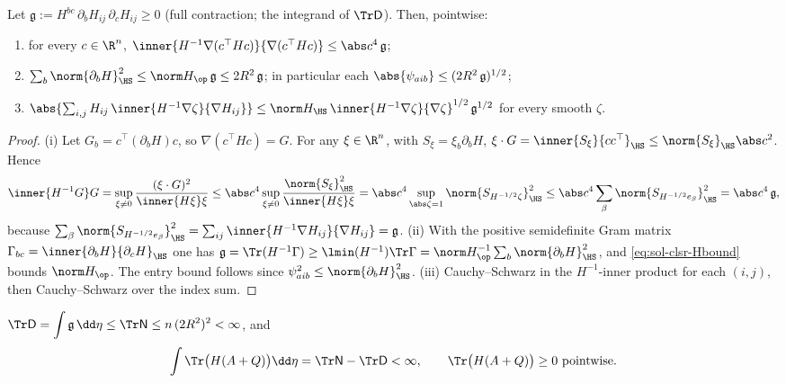 \documentclass[../main.tex]{subfiles}
\begin{document}
\begin{lemma}
\label{lem:sol-clsr-domination}
Let $\mathfrak g:=H^{bc}\,\partial_bH_{ij}\,\partial_cH_{ij}\ge0$ (full contraction; the
integrand of $\Tr\mathsf D$).  Then, pointwise:
\begin{enumerate}[label=(\roman*),leftmargin=2.2em]
\item for every $c\in\R^n$,
$\inner{H^{-1}\nabla(c^\top Hc)}{\nabla(c^\top Hc)}\le\abs c^4\,\mathfrak g$;
\item $\sum_b\norm{\partial_bH}_{\HS}^2\le\norm H_\op\,\mathfrak g\le 2R^2\,\mathfrak g$; in
particular each $\abs{\psi_{aib}}\le(2R^2\,\mathfrak g)^{1/2}$;
\item $\abs{\sum_{i,j}H_{ij}\,\inner{H^{-1}\nabla\zeta}{\nabla H_{ij}}}
\le\norm H_{\HS}\,\inner{H^{-1}\nabla\zeta}{\nabla\zeta}^{1/2}\,\mathfrak g^{1/2}$
for every smooth $\zeta$.
\end{enumerate}
\end{lemma}

\begin{proof}
(i) Let $G_b=c^\top(\partial_bH)c$, so $\nabla(c^\top Hc)=G$.  For any $\xi\in\R^n$, with
$S_\xi=\xi_b\partial_bH$,
$\xi\cdot G=\inner{S_\xi}{cc^\top}_{\HS}\le\norm{S_\xi}_{\HS}\abs c^2$.  Hence
\[
  \inner{H^{-1}G}G=\sup_{\xi\ne0}\frac{(\xi\cdot G)^2}{\inner{H\xi}\xi}
  \le\abs c^4\sup_{\xi\ne0}\frac{\norm{S_\xi}_{\HS}^2}{\inner{H\xi}\xi}
  =\abs c^4\sup_{\abs\zeta=1}\norm{S_{H^{-1/2}\zeta}}_{\HS}^2
  \le\abs c^4\sum_\beta\norm{S_{H^{-1/2}e_\beta}}_{\HS}^2
  =\abs c^4\,\mathfrak g,
\]
because
$\sum_\beta\norm{S_{H^{-1/2}e_\beta}}_{\HS}^2
=\sum_{ij}\inner{H^{-1}\nabla H_{ij}}{\nabla H_{ij}}=\mathfrak g$.
(ii) With the positive semidefinite Gram matrix
$\Gamma_{bc}=\inner{\partial_bH}{\partial_cH}_{\HS}$ one has
$\mathfrak g=\Tr(H^{-1}\Gamma)\ge\lmin(H^{-1})\Tr\Gamma=\norm H_\op^{-1}\sum_b\norm{\partial_bH}_{\HS}^2$,
and \eqref{eq:sol-clsr-Hbound} bounds $\norm H_\op$.  The entry bound follows since
$\psi_{aib}^2\le\norm{\partial_bH}_{\HS}^2$.
(iii) Cauchy--Schwarz in the $H^{-1}$-inner product for each $(i,j)$, then Cauchy--Schwarz over
the index sum.
\end{proof}

\begin{lemma}
\label{lem:sol-clsr-D-finite}
$\displaystyle\Tr\mathsf D=\int\mathfrak g\,\dd\eta\le\Tr\mathsf N\le n\,(2R^2)^2<\infty$, and
\begin{equation}
  \int\Tr\bigl(H(A+Q)\bigr)\dd\eta=\Tr\mathsf N-\Tr\mathsf D<\infty,
  \qquad \Tr\bigl(H(A+Q)\bigr)\ge0\ \text{pointwise}.
  \label{eq:sol-clsr-trace-identity}
\end{equation}
\end{lemma}
\end{document}
